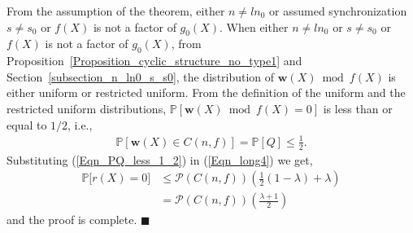 \documentclass[10pt,journal]{IEEEtran}
\begin{document}
From the assumption of the theorem, either $n \neq ln_0$ or assumed synchronization $s \neq s_0$ or
$f(X)$ is not a factor of $g_0(X)$.
% 
When either $n \neq ln_0$ or $s \neq s_0$ or $f(X)$ is not a factor of $g_0(X)$, from Proposition~\ref{Proposition_cyclic_structure_no_type1} 
and Section~\ref{subsection_n_ln0_s_s0}, the distribution of $\mathbf{w}(X) \bmod f(X)$ is either uniform or restricted uniform.
% 
From the definition of the uniform and the restricted uniform distributions,
$\mathbb{P}[\mathbf{w}(X) \bmod f(X) = 0]$ is less than or equal to $1/2$, i.e., 
%  
\begin{align}
%  
\mathbb{P}[\mathbf{w}(X) \in C(n,f)]  = \mathbb{P}[Q] \leq \frac{1}{2}.
\label{Eqn_PQ_less_1_2}
% 
\end{align}
% 
% 
Substituting (\ref{Eqn_PQ_less_1_2}) in (\ref{Eqn_long4}) we get,
%  
\begin{align}
%  
\mathbb{P}\Big[r(X) = 0\Big] 
% 
& \leq \mathcal{P}(C(n,f)) \left( \frac{1}{2} (1 - \lambda) + \lambda \right)\\
% 
& = \mathcal{P}(C(n,f)) \left( \frac{\lambda+1}{2} \right)
% 
\label{Eqn_long5}
% 
\end{align}
%
and the proof is complete.
\hfill $\blacksquare$

\end{document}
